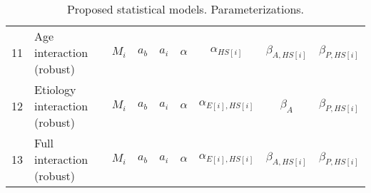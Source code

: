 \begin{table}[h!]
\begin{tabular}{|c|lccccccc|}
		\rowcolor{gray}
		11 & Age interaction (robust) & $M_{i}$ & $a_{b}$ & $a_{i}$ & $\alpha$ & $\alpha_{HS[i]}$ & $\beta_{A, HS[i]}$ & $\beta_{P, HS[i]}$ \\
		12 & Etiology interaction (robust) & $M_{i}$ & $a_{b}$ & $a_{i}$ & $\alpha$ & $\alpha_{E[i],HS[i]}$ & $\beta_{A}$ & $\beta_{P, HS[i]}$ \\
		\rowcolor{gray}
		13 & Full interaction (robust) & $M_{i}$ & $a_{b}$ & $a_{i}$ & $\alpha$ & $\alpha_{E[i],HS[i]}$ & $\beta_{A, HS[i]}$ & $\beta_{P, HS[i]}$ \\
		\hline
	\end{tabular}
	\caption[Proposed statistical models]{Proposed statistical models. Parameterizations.}
	\label{tab:models}
\end{table}
%
%
